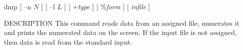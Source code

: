 % 
% 
% 
% 
%                                                                        
%

\begin{synopsis}
\item[dmp] [ --n $N$ ] [ --l $L$ ] [ +{\em type} ] [ $\%${\em form} ] [ {\em infile} ]
\end{synopsis}

\begin{qsection}{DESCRIPTION}
This command reads data from an assigned file,
numerates it and prints the numerated data on the screen.
If the input file is not assigned, then data is read from the standard
input.
\end{qsection}


